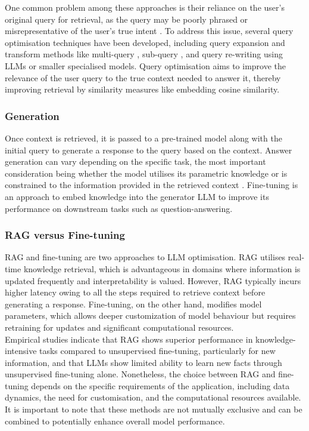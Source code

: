 One common problem among these approaches is their reliance on the user's original query for retrieval, as the query may be poorly phrased or misrepresentative of the user's true intent \cite{gao2024retrievalaugmented}. To address this issue, several query optimisation techniques have been developed, including query expansion and transform methods like multi-query \cite{medium_rag_not_working}, sub-query \cite{zhou2023leasttomostpromptingenablescomplex}, and query re-writing using LLMs or smaller specialised models. Query optimisation aims to improve the relevance of the user query to the true context needed to answer it, thereby improving retrieval by similarity measures like embedding cosine similarity. 


\subsubsection{Generation}

Once context is retrieved, it is passed to a pre-trained model along with the initial query to generate a response to the query based on the context. Answer generation can vary depending on the specific task, the most important consideration being whether the model utilises its parametric knowledge or is constrained to the information provided in the retrieved context \cite{gao2024retrievalaugmented}. Fine-tuning is an approach to embed knowledge into the generator LLM to improve its performance on downstream tasks such as question-answering. 


\subsubsection{RAG versus Fine-tuning}

RAG and fine-tuning are two approaches to LLM optimisation. RAG utilises real-time knowledge retrieval, which is advantageous in domains where information is updated frequently and interpretability is valued. However, RAG typically incurs higher latency owing to all the steps required to retrieve context before generating a response. Fine-tuning, on the other hand, modifies model parameters, which allows deeper customization of model behaviour but requires retraining for updates and significant computational resources.\\

Empirical studies \cite{gao2024retrievalaugmented} indicate that RAG shows superior performance in knowledge-intensive tasks compared to unsupervised fine-tuning, particularly for new information, and that LLMs show limited ability to learn new facts through unsupervised fine-tuning alone. Nonetheless, the choice between RAG and fine-tuning depends on the specific requirements of the application, including data dynamics, the need for customisation, and the computational resources available. It is important to note that these methods are not mutually exclusive and can be combined to potentially enhance overall model performance.


